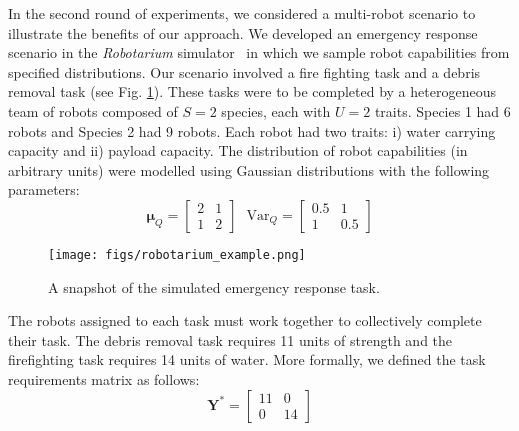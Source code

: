 \documentclass[letterpaper, 10 pt, conference]{ieeeconf}  %
\begin{document}
In the second round of experiments, we considered a multi-robot scenario to illustrate the benefits of our approach. We developed an emergency response scenario in the \emph{Robotarium} simulator~\cite{wilson2020} in which we sample robot capabilities from specified distributions. Our scenario involved a fire fighting task and a debris removal task (see Fig. \ref{fig:robot_example}). These tasks were to be completed by a heterogeneous team of robots composed of $S=2$ species, each with $U=2$ traits. Species 1 had 6 robots and Species 2 had 9 robots. Each robot had two traits: i) water carrying capacity and ii) payload capacity. The distribution of robot capabilities (in arbitrary units) were modelled using Gaussian distributions with the following parameters:
$$ \bm{\mu}_Q = \begin{bmatrix} 2 & 1\\ 1 & 2 \end{bmatrix}\text{    } \mathrm{Var}_Q = \begin{bmatrix} 0.5 & 1\\ 1 & 0.5 \end{bmatrix}$$

\begin{figure}[!h]
    \centering
    \texttt{[image: figs/robotarium\_example.png]}
    \caption{A snapshot of the simulated emergency response task. 
    }
    \label{fig:robot_example}
\end{figure}

The robots assigned to each task must work together to collectively complete their task.  The debris removal task requires 11 units of strength and the firefighting task requires 14 units of water. More formally, we defined the task requirements matrix as follows:
$$\bm{Y}^* = \begin{bmatrix} 11 & 0 \\ 0 & 14 \end{bmatrix} $$
\end{document}
